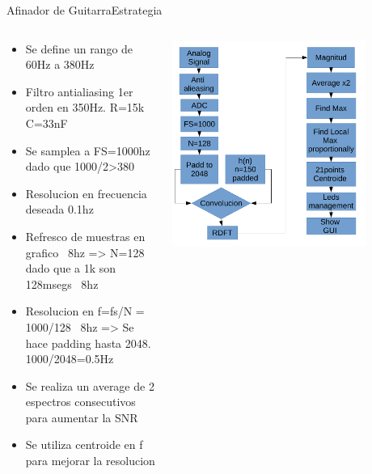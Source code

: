 \begin{frame}[t]{Afinador de Guitarra}{Estrategia}
   \footnotesize
   \begin{columns}
      \begin{column}{.5\textwidth}
         \begin{itemize}
            \item{Se define un rango de 60Hz a 380Hz}
            \item{Filtro antialiasing 1er orden en 350Hz. R=15k C=33nF}
            \item{Se samplea a FS=1000hz dado que 1000/2>380}
            \item{Resolucion en frecuencia deseada 0.1hz}
            \item{Refresco de muestras en grafico ~8hz => N=128 dado que a 1k son 128msegs ~8hz}
            \item{Resolucion en f=fs/N = 1000/128 ~8hz => Se hace padding hasta 2048. 1000/2048=0.5Hz}
            \item{Se realiza un average de 2 espectros consecutivos para aumentar la SNR}
            \item{Se utiliza centroide en f para mejorar la resolucion}
         \end{itemize}
      \end{column}
      \begin{column}{.5\textwidth}
         \center\includegraphics[width=0.8\textwidth]{7_clase/bloques}
      \end{column}
   \end{columns}
   \vfill
   \note{
      \begin{itemize}
         \item{}
         \item{}
      \end{itemize}
   }
\end{frame}
